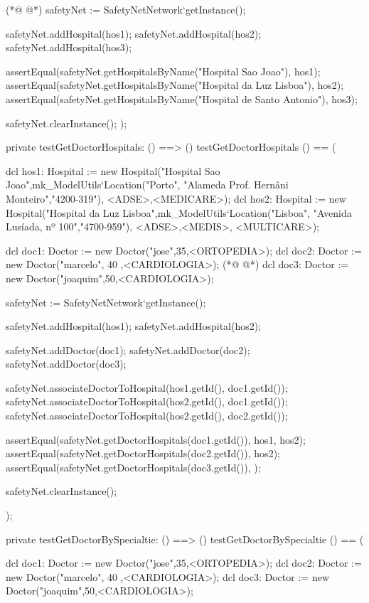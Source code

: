 \begin{vdmpp}[breaklines=true]
(*@
\label{testGetDoctorBySpecialtie:444}
@*)
  safetyNet := SafetyNetNetwork`getInstance();
   
  safetyNet.addHospital(hos1);
  safetyNet.addHospital(hos2);
  safetyNet.addHospital(hos3);
 
  assertEqual(safetyNet.getHospitalsByName("Hospital Sao Joao"), {hos1});
  assertEqual(safetyNet.getHospitalsByName("Hospital da Luz Lisboa"), {hos2});
  assertEqual(safetyNet.getHospitalsByName("Hospital de Santo Antonio"), {hos3});
  
  safetyNet.clearInstance();
);

private testGetDoctorHospitals: () ==> ()
 testGetDoctorHospitals () == (
 
  dcl hos1: Hospital := new Hospital("Hospital Sao Joao",mk_ModelUtils`Location("Porto", "Alameda Prof. Hernâni Monteiro","4200-319"), {<ADSE>,<MEDICARE>});
  dcl hos2: Hospital := new Hospital("Hospital da Luz Lisboa",mk_ModelUtils`Location("Lisboa", "Avenida Lusíada, nº 100","4700-959"), {<ADSE>,<MEDIS>, <MULTICARE>});
  
  dcl doc1: Doctor := new Doctor("jose",35,<ORTOPEDIA>);
  dcl doc2: Doctor := new Doctor("marcelo", 40 ,<CARDIOLOGIA>);
(*@
\label{testGetHospitalSpecialties:465}
@*)
  dcl doc3: Doctor := new Doctor("joaquim",50,<CARDIOLOGIA>);
  
  safetyNet := SafetyNetNetwork`getInstance();
   
  safetyNet.addHospital(hos1);
  safetyNet.addHospital(hos2);
  
  safetyNet.addDoctor(doc1);
  safetyNet.addDoctor(doc2);
  safetyNet.addDoctor(doc3);

  safetyNet.associateDoctorToHospital(hos1.getId(), doc1.getId());
  safetyNet.associateDoctorToHospital(hos2.getId(), doc1.getId());
  safetyNet.associateDoctorToHospital(hos2.getId(), doc2.getId());

  assertEqual(safetyNet.getDoctorHospitals(doc1.getId()), {hos1, hos2});
  assertEqual(safetyNet.getDoctorHospitals(doc2.getId()), {hos2});
  assertEqual(safetyNet.getDoctorHospitals(doc3.getId()), {});  
  
  safetyNet.clearInstance();
    
);

private testGetDoctorBySpecialtie: () ==> ()
 testGetDoctorBySpecialtie () == (
 
  dcl doc1: Doctor := new Doctor("jose",35,<ORTOPEDIA>);
  dcl doc2: Doctor := new Doctor("marcelo", 40 ,<CARDIOLOGIA>);
  dcl doc3: Doctor := new Doctor("joaquim",50,<CARDIOLOGIA>);
  

\end{vdmpp}
